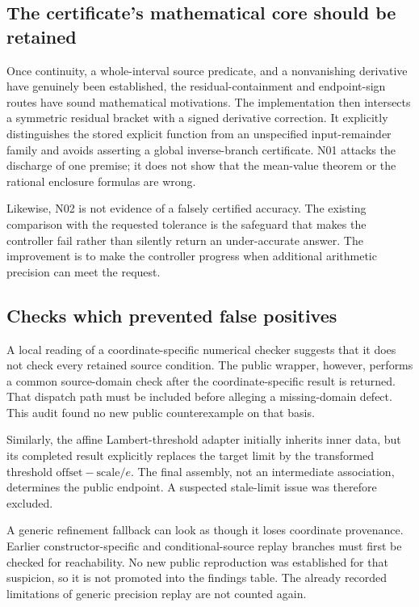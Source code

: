 \documentclass[11pt,a4paper]{article}
\newcommand{\code}[1]{\texttt{\detokenize{#1}}}
\begin{document}
\subsection{The certificate's mathematical core should be retained}
Once continuity, a whole-interval source predicate, and a nonvanishing derivative have genuinely been established, the residual-containment and endpoint-sign routes have sound mathematical motivations. The implementation then intersects a symmetric residual bracket with a signed derivative correction. It explicitly distinguishes the stored explicit function from an unspecified input-remainder family and avoids asserting a global inverse-branch certificate. N01 attacks the discharge of one premise; it does not show that the mean-value theorem or the rational enclosure formulas are wrong.\cite{cert}

Likewise, N02 is not evidence of a falsely certified accuracy. The existing comparison with the requested tolerance is the safeguard that makes the controller fail rather than silently return an under-accurate answer. The improvement is to make the controller progress when additional arithmetic precision can meet the request.

\subsection{Checks which prevented false positives}
A local reading of a coordinate-specific numerical checker suggests that it does not check every retained source condition. The public \code{InverseNumericalCheck} wrapper, however, performs a common source-domain check after the coordinate-specific result is returned. That dispatch path must be included before alleging a missing-domain defect. This audit found no new public counterexample on that basis.\cite{main,numerical,coordinate}

Similarly, the affine Lambert-threshold adapter initially inherits inner data, but its completed result explicitly replaces the target limit by the transformed threshold \(\mathrm{offset}-\mathrm{scale}/e\). The final assembly, not an intermediate association, determines the public endpoint. A suspected stale-limit issue was therefore excluded.\cite{special}

A generic refinement fallback can look as though it loses coordinate provenance. Earlier constructor-specific and conditional-source replay branches must first be checked for reachability. No new public reproduction was established for that suspicion, so it is not promoted into the findings table. The already recorded limitations of generic precision replay are not counted again.\cite{operations,refinement,status}
\end{document}

